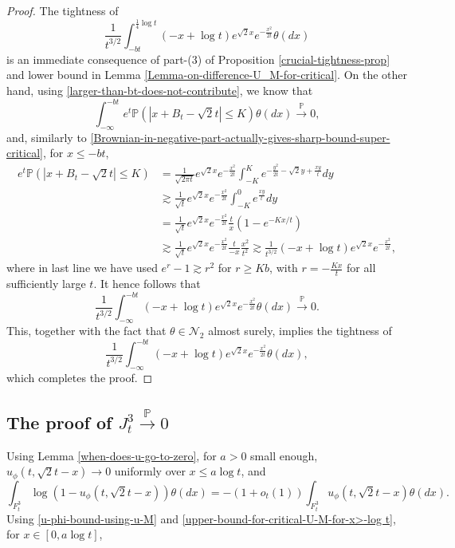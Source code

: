 \documentclass[a4paper,reqno]{amsart}%
\newcommand{\1}{\mathbf 1}
\theoremstyle{mine}
\numberwithin{theorem}{section}
\numberwithin{equation}{section}
\theoremstyle{remark}
\begin{document}
\begin{proof}
    The tightness of 
    \[\frac{1}{t^{3/2}}\int_{-bt}^{\frac{1}{4} \log t }(-x + \log t)e^{\sqrt{2}x} e^{-\frac{x^2}{2t}} \theta(dx)\]
 is an immediate consequence of part-(3) of Proposition \ref{crucial-tightness-prop} and lower bound in Lemma \ref{Lemma-on-difference-U_M-for-critical}. On the other hand, using \eqref{larger-than-bt-does-not-contribute}, we know that 
\begin{equation}
    \int_{-\infty}^{-bt} e^t \mathbb{P}(| x+ B_t - \sqrt{2} t| \leq K) \theta(dx) \overset{\mathbb{P}}{\to} 0,
\end{equation} 
and, similarly to \eqref{Brownian-in-negative-part-actually-gives-sharp-bound-super-critical}, for $x \leq -bt$, 
\begin{align} \label{Brownian-in-negative-part-actually-gives-sharp-bound-for-critical}
    \nonumber e^t \mathbb{P}(|x + B_t - \sqrt{2} t| \leq K) &=  \frac{1}{\sqrt{2\pi t}}e^{\sqrt{2} x}e^{-\frac{x^2}{2t}} \int_{-K}^K e^{-\frac{y^2}{2t}-\sqrt{2} y+ \frac{xy}{t}}dy \\ 
     \nonumber & \gtrsim \frac{1}{\sqrt{t}}e^{\sqrt{2} x}e^{-\frac{x^2}{2t}} \int_{-K}^0 e^{\frac{xy}{t}}dy \\
    \nonumber& =  \frac{1}{\sqrt{t}}e^{\sqrt{2} x}e^{-\frac{x^2}{2t}} \frac{t}{x}(1-e^{-Kx/t}) \\ 
    \nonumber & \gtrsim \frac{1}{\sqrt{t}}e^{\sqrt{2} x}e^{-\frac{x^2}{2t}} \frac{t}{-x}\frac{x^2}{t^2} \gtrsim \frac{1}{t^{3/2}}(-x + \log t)e^{\sqrt{2} x}e^{-\frac{x^2}{2t}},
\end{align}
where in last line we have used $e^r - 1 \gtrsim r^2$ for $ r \ge Kb$, with $r = -\frac{Kx}{t}$ for all sufficiently large $t$. It hence follows that 
\[\frac{1}{t^{3/2}}\int_{-\infty}^{-bt}(-x + \log t)e^{\sqrt{2}x} e^{-\frac{x^2}{2t}} \theta(dx) \overset{\mathbb{P}}{\to} 0.\]
This, together with the fact that $\theta \in \mathcal{N}_2$ almost surely, implies the tightness of 
\[\frac{1}{t^{3/2}}\int_{-\infty}^{-bt}(-x + \log t)e^{\sqrt{2}x} e^{-\frac{x^2}{2t}} \theta(dx),\]
which completes the proof. 
\end{proof}

\subsection{The proof of $J_t^3 \overset{\mathbb{P}}{\to} 0$}

Using Lemma \ref{when-does-u-go-to-zero}, for $a>0$ small enough, $u_\phi(t, \sqrt{2}t -x) \to 0 $ uniformly over $x \leq a \log t$, and 
\begin{equation}
\int_{F_t^3}\log(1- u_\phi(t, \sqrt{2} t -x))\theta(dx) = -(1+ o_t(1)) \int_{F_t^3}u_\phi(t, \sqrt{2} t -x)\theta(dx).
\end{equation}
Using \eqref{u-phi-bound-using-u-M} and \eqref{upper-bound-for-critical-U-M-for-x>-log t}, for $x \in [0, a \log t]$, 
\end{document}
